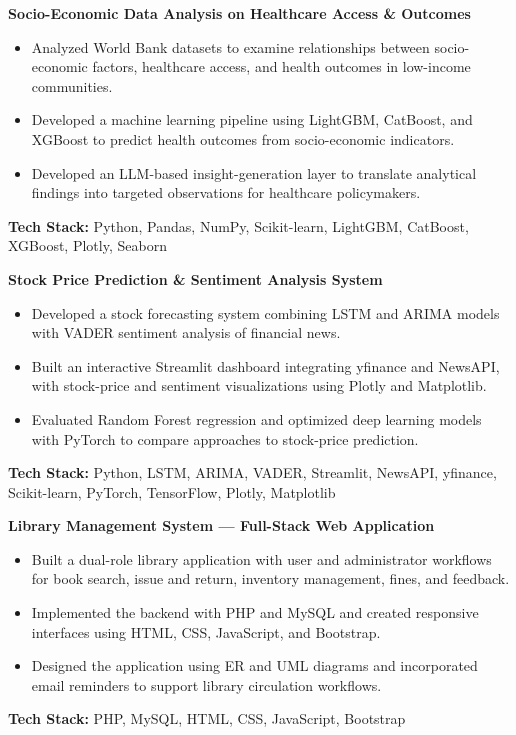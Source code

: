 \noindent\textbf{Socio-Economic Data Analysis on Healthcare Access \& Outcomes}
\begin{itemize}[leftmargin=*,nosep,topsep=3pt]
  \item Analyzed World Bank datasets to examine relationships between socio-economic factors, healthcare access, and health outcomes in low-income communities.
  \item Developed a machine learning pipeline using LightGBM, CatBoost, and XGBoost to predict health outcomes from socio-economic indicators.
  \item Developed an LLM-based insight-generation layer to translate analytical findings into targeted observations for healthcare policymakers.
\end{itemize}
\noindent\textbf{Tech Stack:} Python, Pandas, NumPy, Scikit-learn, LightGBM, CatBoost, XGBoost, Plotly, Seaborn\par\medskip

\noindent\textbf{Stock Price Prediction \& Sentiment Analysis System}
\begin{itemize}[leftmargin=*,nosep,topsep=3pt]
  \item Developed a stock forecasting system combining LSTM and ARIMA models with VADER sentiment analysis of financial news.
  \item Built an interactive Streamlit dashboard integrating yfinance and NewsAPI, with stock-price and sentiment visualizations using Plotly and Matplotlib.
  \item Evaluated Random Forest regression and optimized deep learning models with PyTorch to compare approaches to stock-price prediction.
\end{itemize}
\noindent\textbf{Tech Stack:} Python, LSTM, ARIMA, VADER, Streamlit, NewsAPI, yfinance, Scikit-learn, PyTorch, TensorFlow, Plotly, Matplotlib\par\medskip

\noindent\textbf{Library Management System --- Full-Stack Web Application}
\begin{itemize}[leftmargin=*,nosep,topsep=3pt]
  \item Built a dual-role library application with user and administrator workflows for book search, issue and return, inventory management, fines, and feedback.
  \item Implemented the backend with PHP and MySQL and created responsive interfaces using HTML, CSS, JavaScript, and Bootstrap.
  \item Designed the application using ER and UML diagrams and incorporated email reminders to support library circulation workflows.
\end{itemize}
\noindent\textbf{Tech Stack:} PHP, MySQL, HTML, CSS, JavaScript, Bootstrap\par\medskip

